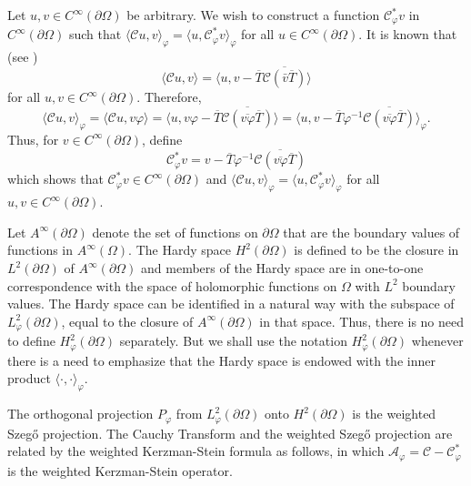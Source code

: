 \documentclass[11pt, reqno]{amsart}
\numberwithin{equation}{section}
\newcommand{\ov}{\overline}
\begin{document}
Let $u,v\in C^{\infty}(\partial\Omega)$ be arbitrary. We wish to construct a function $\mathcal{C}^*_{\varphi}v$ in $C^{\infty}(\partial\Omega)$ such that $\langle\mathcal{C}u,v\rangle_{\varphi}=\langle u,\mathcal{C}^{*}_{\varphi}v\rangle_{\varphi}$ for all $u\in C^{\infty}(\partial\Omega)$. It is known that (see \cite{Be0})
\[
\langle \mathcal{C}u,v\rangle=\langle u,v-\ov{T}\overline{\mathcal{C}(\bar{v}\ov{T})}\rangle
\]
for all $u,v\in C^{\infty}(\partial \Omega)$. Therefore,
\[
\langle\mathcal{C}u,v\rangle_{\varphi}
=
\langle \mathcal{C}u, v\varphi\rangle
=
\langle u,v\varphi-\overline{T}\overline{\mathcal{C}(\overline{v\varphi}\overline{T})}\rangle
=
\langle u,v-\overline{T}\varphi^{-1}\overline{\mathcal{C}(\overline{v\varphi}\overline{T})}\rangle_{\varphi}.
\]
Thus, for $v\in C^{\infty}(\partial\Omega)$, define
\begin{equation}
\mathcal{C}^{*}_{\varphi}v=v-\overline{T}\varphi^{-1}\overline{\mathcal{C}(\overline{v\varphi}\overline{T})}
\end{equation}
which shows that $\mathcal{C}^{*}_{\varphi}v\in C^{\infty}(\partial\Omega)$ and $\langle\mathcal{C}u,v\rangle_{\varphi}=\langle u,\mathcal{C}^{*}_{\varphi}v\rangle_{\varphi}$ for all $u,v\in C^{\infty}(\partial\Omega)$.

\medskip 

Let $A^{\infty}(\partial\Omega)$ denote the set of functions on $\partial\Omega$ that are the boundary values of functions in $A^{\infty}(\Omega)$. The Hardy space $H^2(\partial\Omega)$ is defined to be the closure in $L^2(\partial\Omega)$ of $A^{\infty}(\partial\Omega)$ and members of the Hardy space are in one-to-one correspondence with the space of holomorphic functions on $\Omega$ with $L^2$ boundary values. The Hardy space can be identified in a natural way with the subspace of $L^2_{\varphi}(\partial\Omega)$, equal to the closure of $A^{\infty}(\partial\Omega)$ in that space. Thus, there is no need to define $H^2_{\varphi}(\partial\Omega)$ separately. But we shall use the notation $H^2_{\varphi}(\partial\Omega)$ whenever there is a need to emphasize that the Hardy space is endowed with the inner product $\langle \cdot,\cdot\rangle_{\varphi}$. 

\medskip

The orthogonal projection $P_{\varphi}$ from $L^2_{\varphi}(\partial\Omega)$ onto $H^2(\partial\Omega)$ is the weighted Szeg\H{o} projection. The Cauchy Transform and the weighted Szeg\H{o} projection are related by the weighted Kerzman-Stein formula as follows, in which $\mathcal{A}_{\varphi} = \mathcal{C}-\mathcal{C}^{*}_{\varphi}$ is the weighted Kerzman-Stein operator.
\end{document}
